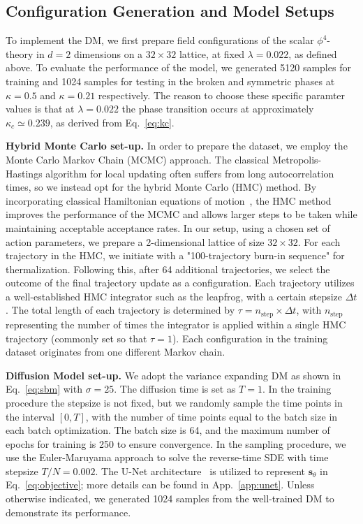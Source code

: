\subsection{Configuration Generation and Model Setups}

To implement the DM, we first prepare field configurations of the scalar $\phi^4$-theory in $d=2$ dimensions on a $32 \times 32$ lattice, at fixed $\lambda = 0.022$, as defined above. To evaluate the performance of the model, we generated 5120 samples for training and 1024 samples for testing in the broken and symmetric phases at $\kappa = 0.5$ and $\kappa = 0.21$ respectively. The reason to choose these specific paramter values is that at $\lambda = 0.022$ the phase transition occurs at approximately $\kappa_c \simeq 0.239$, as derived from Eq.~\eqref{eq:kc}.

\textbf{Hybrid Monte Carlo set-up.} In order to prepare the dataset, we employ the Monte Carlo Markov Chain (MCMC) approach. The classical Metropolis-Hastings algorithm for local updating often suffers from long autocorrelation times, so we instead opt for the hybrid Monte Carlo (HMC) method. By incorporating classical Hamiltonian equations of motion~\cite{neal2011mcmc}, the HMC method improves the performance of the MCMC and allows larger steps to be taken while maintaining acceptable acceptance rates. In our setup, using a chosen set of action parameters, we prepare a 2-dimensional lattice of size $32 \times 32$. For each trajectory in the HMC, we initiate with a "100-trajectory burn-in sequence" for thermalization. Following this, after 64 additional trajectories, we select the outcome of the final trajectory update as a configuration. Each trajectory utilizes a well-established HMC integrator such as the leapfrog, with a certain stepsize $\Delta t$. The total length of each trajectory is determined by $\tau = n_\text{step} \times \Delta t$, with $n_\text{step}$ representing the number of times the integrator is applied within a single HMC trajectory (commonly set so that $\tau = 1$). Each configuration in the training dataset originates from one different Markov chain.

\textbf{Diffusion Model set-up.} We adopt the variance expanding DM as shown in Eq.~\eqref{eq:sbm} with $\sigma = 25$. The diffusion time is set as $T = 1$. 
In the training procedure the stepsize is not fixed, but we randomly sample the time points in the interval $[0,T]$, with the number of time points equal to the batch size in each batch optimization. The batch size is 64, and the maximum number of epochs for training is 250 to ensure convergence.  In the sampling procedure, we use the Euler-Maruyama approach to solve the reverse-time SDE with time stepsize $T/N = 0.002$. The U-Net architecture~\cite{Ronneberger:2015unet} is utilized to represent $\mathbf{s}_\theta$ in Eq.~\eqref{eq:objective}; more details can be found in App.~\ref{app:unet}. Unless otherwise indicated, we generated 1024 samples from the well-trained DM to demonstrate its performance.

